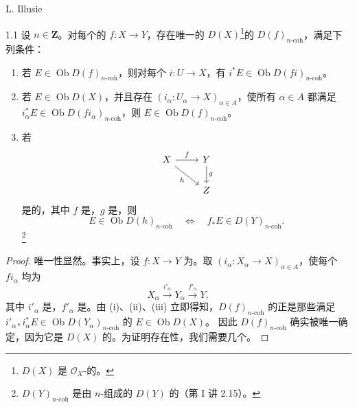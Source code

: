 \begin{center}L. Illusie\end{center}
\begin{SGAresult}{}{1.1}
设 $n\in\mathbf Z$。对每个的 $f:X\to Y$，存在唯一的 $D(X)$\footnote{$D(X)$ 是 $\mathcal O_X$-的。}的 $D(f)_{n\text{-coh}}$，满足下列条件：
\begin{enumerate}
\item[(i)] 若 $E\in\operatorname{Ob}D(f)_{n\text{-coh}}$，则对每个 $i:U\to X$，有 $i^*E\in\operatorname{Ob}D(fi)_{n\text{-coh}}$。
\item[(ii)] 若 $E\in\operatorname{Ob}D(X)$，并且存在 $(i_\alpha:U_\alpha\to X)_{\alpha\in A}$，使所有 $\alpha\in A$ 都满足 $i_\alpha^*E\in\operatorname{Ob}D(fi_\alpha)_{n\text{-coh}}$，则 $E\in\operatorname{Ob}D(f)_{n\text{-coh}}$。
\item[(iii)] 若
\[
\begin{tikzcd}X\arrow[r,"f"]\arrow[dr,"h"']&Y\arrow[d,"g"]\\&Z\end{tikzcd}
\]
是的，其中 $f$ 是，$g$ 是，则
\[
E\in\operatorname{Ob}D(h)_{n\text{-coh}}
\quad\Longleftrightarrow\quad f_*E\in D(Y)_{n\text{-coh}}.
\]
\footnote{$D(Y)_{n\text{-coh}}$ 是由 $n$-组成的 $D(Y)$ 的（第 I 讲 2.15）。}
\end{enumerate}
\end{SGAresult}
\begin{proof}
唯一性显然。事实上，设 $f:X\to Y$ 为。取 $(i_\alpha:X_\alpha\to X)_{\alpha\in A}$，使每个 $fi_\alpha$ 均为
\[
X_\alpha\xrightarrow{i'_\alpha}Y_\alpha\xrightarrow{f'_\alpha}Y,
\]
其中 $i'_\alpha$ 是，$f'_\alpha$ 是。由 (i)、(ii)、(iii) 立即得知，$D(f)_{n\text{-coh}}$ 的正是那些满足 $i'_{\alpha*}i_\alpha^*E\in\operatorname{Ob}D(Y_\alpha)_{n\text{-coh}}$ 的 $E\in\operatorname{Ob}D(X)$。
因此 $D(f)_{n\text{-coh}}$ 确实被唯一确定，因为它是 $D(X)$ 的。为证明存在性，我们需要几个。
\end{proof}
